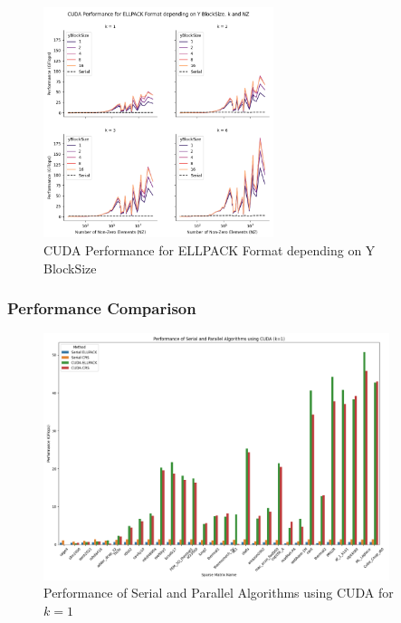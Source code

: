 \documentclass[12pt,oneside]{book} %
\begin{document}
\begin{figure}[H]
    \centering
    \includegraphics[width=0.6\textwidth]{../results/images/CUDA_yBlockSize_ELLPACK.png}
    \caption{CUDA Performance for ELLPACK Format depending on Y BlockSize}
    \label{fig:cudayblocksizeellpack}
\end{figure}

\subsubsection{Performance Comparison}

\begin{figure}[H]
    \centering
    \includegraphics[width=0.9\textwidth]{../results/images/CUDA_Performance_k1.png}
    \caption{Performance of Serial and Parallel Algorithms using CUDA for $k=1$}
    \label{fig:cuda-performance-k1}
\end{figure}
\end{document}
